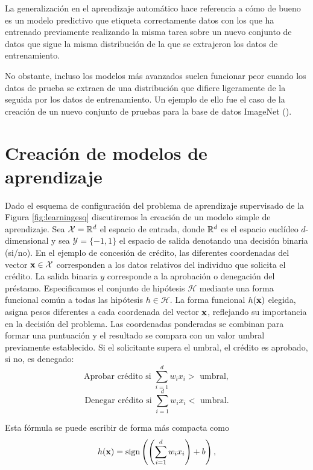 \documentclass[oneside,openright,titlepage,numbers=noenddot,openany,headinclude,footinclude=true,
cleardoublepage=empty,abstractoff,BCOR=5mm,paper=a4,fontsize=12pt,main=spanish]{scrreprt}
\begin{document}
La generalización en el aprendizaje automático hace referencia a cómo de bueno es un modelo predictivo que etiqueta correctamente datos con los que ha entrenado previamente realizando la misma tarea sobre un nuevo conjunto de datos que sigue la misma distribución de la que se extrajeron los datos de entrenamiento. %

No obstante, incluso los modelos más avanzados suelen funcionar peor cuando los datos de prueba se extraen de una distribución que difiere ligeramente de la seguida por los datos de entrenamiento. Un ejemplo de ello fue el caso de la creación de un nuevo conjunto de pruebas para la base de datos ImageNet (\cite{generalize2019}).

\section{Creación de modelos de aprendizaje}

Dado el esquema de configuración del problema de aprendizaje supervisado de la Figura \ref{fig:learningesq} discutiremos la creación de un modelo simple de aprendizaje. Sea $\mathcal{X}=\mathbb{R}^d$ el espacio de entrada, donde $\mathbb{R}^d$ es el espacio euclídeo $d$-dimensional y sea $\mathcal{Y}=\{-1,1\}$ el espacio de salida denotando una decisión binaria (si/no). En el ejemplo de concesión de crédito, las diferentes coordenadas del vector $\textbf{x}\in \mathcal{X}$ corresponden a los datos relativos del individuo que solicita el crédito. La salida binaria $y$ corresponde a la aprobación o denegación del préstamo. Especificamos el conjunto de hipótesis $\mathcal{H}$ mediante una forma funcional común a todas las hipótesis $h\in \mathcal{H}$. La forma funcional $h(\textbf{x})$ elegida, asigna pesos diferentes a cada coordenada del vector $\textbf{x}$, reflejando su importancia en la decisión del problema. Las coordenadas ponderadas se combinan para formar una puntuación y el resultado se compara con un valor umbral previamente establecido. Si el solicitante supera el umbral, el crédito es aprobado, si no, es denegado: $$\text{Aprobar crédito si } \sum_{i=1}^d w_ix_i > \text{ umbral},$$ $$\text{Denegar crédito si } \sum_{i=1}^d w_ix_i < \text{ umbral}.$$

Esta fórmula se puede escribir de forma más compacta como 
\begin{equation} \label{eq:sign-6}
h(\textbf{x})=\text{sign}\left(\left( \sum_{i=1}^d w_ix_i\right)+b \right),
\end{equation}
\end{document}
